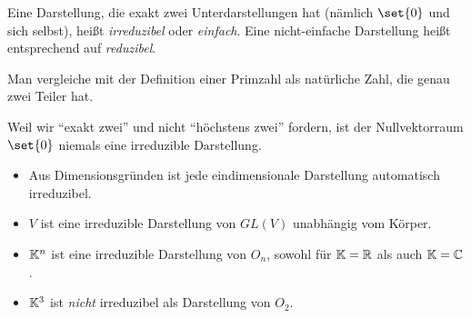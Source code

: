 \begin{definition}
Eine Darstellung, die exakt zwei Unterdarstellungen hat (nämlich $\set{0}$ und sich selbst), heißt \emph{irreduzibel} oder \emph{einfach}. Eine nicht-einfache Darstellung heißt entsprechend auf \emph{reduzibel}.
\end{definition}

\begin{remark}
Man vergleiche mit der Definition einer Primzahl als natürliche Zahl, die genau zwei Teiler hat.
\end{remark}

\begin{remark}
Weil wir \enquote{exakt zwei} und nicht \enquote{höchstens zwei} fordern, ist der Nullvektorraum $\set{0}$ niemals eine irreduzible Darstellung.
\end{remark}

\begin{example}
\begin{itemize}
\item Aus Dimensionsgründen ist jede eindimensionale Darstellung automatisch irreduzibel.
\item $V$ ist eine irreduzible Darstellung von $GL(V)$ unabhängig vom Körper.
\item $\mathbb{K}^n$ ist eine irreduzible Darstellung von $O_n$, sowohl für $\mathbb{K}=\mathbb{R}$ als auch $\mathbb{K}=\mathbb{C}$.
\item $\mathbb{K}^3$ ist \emph{nicht} irreduzibel als Darstellung von $O_2$.
\end{itemize}
\end{example}

